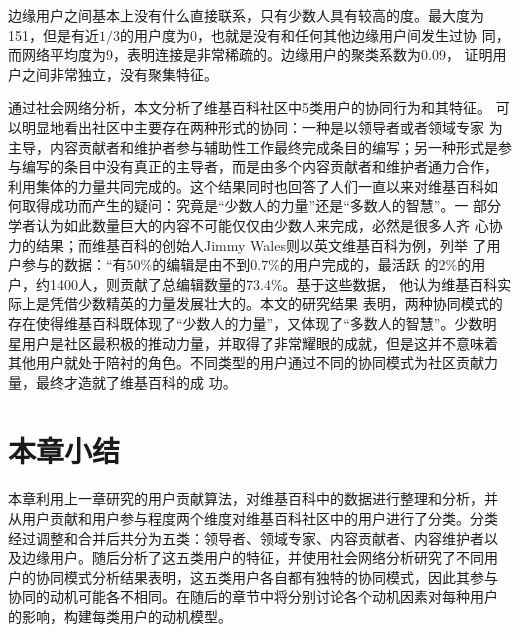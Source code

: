 边缘用户之间基本上没有什么直接联系，只有少数人具有较高的度。最大度为
151，但是有近$1/3$的用户度为0，也就是没有和任何其他边缘用户间发生过协
同，而网络平均度为9，表明连接是非常稀疏的。边缘用户的聚类系数为0.09，
证明用户之间非常独立，没有聚集特征。

通过社会网络分析，本文分析了维基百科社区中5类用户的协同行为和其特征。
可以明显地看出社区中主要存在两种形式的协同：一种是以领导者或者领域专家
为主导，内容贡献者和维护者参与辅助性工作最终完成条目的编写；另一种形式是参
与编写的条目中没有真正的主导者，而是由多个内容贡献者和维护者通力合作，
利用集体的力量共同完成的。这个结果同时也回答了人们一直以来对维基百科如
何取得成功而产生的疑问：究竟是“少数人的力量”还是“多数人的智慧”。一
部分学者认为如此数量巨大的内容不可能仅仅由少数人来完成，必然是很多人齐
心协力的结果；而维基百科的创始人Jimmy Wales则以英文维基百科为例，列举
了用户参与的数据：“有$50\%$的编辑是由不到$0.7\%$的用户完成的，最活跃
的$2\%$的用户，约1400人，则贡献了总编辑数量的$73.4\%$。基于这些数据，
他认为维基百科实际上是凭借少数精英的力量发展壮大的。本文的研究结果
表明，两种协同模式的
存在使得维基百科既体现了“少数人的力量”，又体现了“多数人的智慧”。少数明
星用户是社区最积极的推动力量，并取得了非常耀眼的成就，但是这并不意味着
其他用户就处于陪衬的角色。不同类型的用户通过不同的协同模式为社区贡献力量，最终才造就了维基百科的成
功。

\section{本章小结}
\label{sec:conclusion}

本章利用上一章研究的用户贡献算法，对维基百科中的数据进行整理和分析，并
从用户贡献和用户参与程度两个维度对维基百科社区中的用户进行了分类。分类
经过调整和合并后共分为五类：领导者、领域专家、内容贡献者、内容维护者以
及边缘用户。随后分析了这五类用户的特征，并使用社会网络分析研究了不同用
户的协同模式分析结果表明，这五类用户各自都有独特的协同模式，因此其参与
协同的动机可能各不相同。在随后的章节中将分别讨论各个动机因素对每种用户
的影响，构建每类用户的动机模型。
